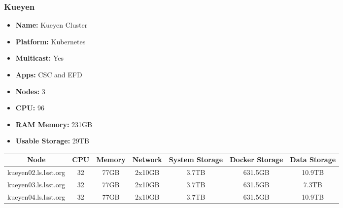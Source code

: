 \subsubsection{Kueyen}
\vspace*{0.1mm}
\begin{itemize}
  \itemsep0em 
  \item \textbf{Name:}       Kueyen Cluster
  \item \textbf{Platform:}   Kubernetes
  \item \textbf{Multicast:}  Yes
  \item \textbf{Apps:}       CSC and EFD
  \item \textbf{Nodes:}      3
  \item \textbf{CPU:}        96
  \item \textbf{RAM Memory:} 231GB
  \item \textbf{Usable Storage:} 29TB
\end{itemize}
\begin{center}
  \small
  \begin{tabular}{||c c c c c c c||}
    \hline
    \textbf{Node} & \textbf{CPU} & \textbf{Memory} & \textbf{Network} & \textbf{System Storage} & \textbf{Docker Storage} & \textbf{Data Storage} \\ [0.5ex]
    \hline
    kueyen02.ls.lsst.org & 32 & 77GB & 2x10GB & 3.7TB & 631.5GB & 10.9TB \\
    \hline
    kueyen03.ls.lsst.org & 32 & 77GB & 2x10GB & 3.7TB & 631.5GB & 7.3TB \\
    \hline
    kueyen04.ls.lsst.org & 32 & 77GB & 2x10GB & 3.7TB & 631.5GB & 10.9TB\\
    \hline
  \end{tabular}
\end{center}
\vspace*{0.1mm}
\newpage
